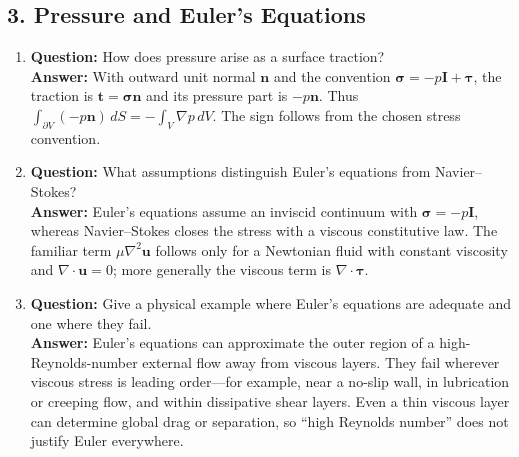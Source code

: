 \documentclass[12pt]{article}
\begin{document}
\subsection*{3. Pressure and Euler’s Equations}
\begin{enumerate}
\item \textbf{Question:} How does pressure arise as a surface traction?\\
\textbf{Answer:} With outward unit normal $\mathbf{n}$ and the convention $\boldsymbol{\sigma}=-p\mathbf{I}+\boldsymbol{\tau}$, the traction is $\mathbf{t}=\boldsymbol{\sigma}\mathbf{n}$ and its pressure part is $-p\mathbf{n}$. Thus $\int_{\partial V}(-p\mathbf{n})\,dS=-\int_V\nabla p\,dV$. The sign follows from the chosen stress convention.

\item \textbf{Question:} What assumptions distinguish Euler’s equations from Navier--Stokes?\\
\textbf{Answer:} Euler's equations assume an inviscid continuum with $\boldsymbol{\sigma}=-p\mathbf{I}$, whereas Navier--Stokes closes the stress with a viscous constitutive law. The familiar term $\mu\nabla^2\mathbf{u}$ follows only for a Newtonian fluid with constant viscosity and $\nabla\cdot\mathbf{u}=0$; more generally the viscous term is $\nabla\cdot\boldsymbol{\tau}$.

\item \textbf{Question:} Give a physical example where Euler’s equations are adequate and one where they fail.\\
\textbf{Answer:} Euler's equations can approximate the outer region of a high-Reynolds-number external flow away from viscous layers. They fail wherever viscous stress is leading order---for example, near a no-slip wall, in lubrication or creeping flow, and within dissipative shear layers. Even a thin viscous layer can determine global drag or separation, so ``high Reynolds number'' does not justify Euler everywhere.
\end{enumerate}
\end{document}
